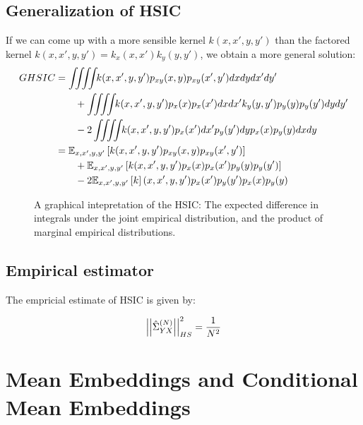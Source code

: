 \documentclass{article} %
\begin{document}
\subsection{Generalization of HSIC}

If we can come up with a more sensible kernel $k(x,x',y,y')$ than the factored kernel $k(x,x',y,y') = k_x(x,x') k_y(y,y')$, we obtain a more general solution:
%
\begin{align}
GHSIC & = \int \!\!\! \int \!\!\!\int \!\!\! \int\!\! k(x,x',y,y')p_{xy}(x,y)p_{xy}(x',y')dxdydx'dy' \\
\nonumber & \qquad + \int \!\!\! \int\!\!\! \int \!\!\! \int\!\! k(x,x',y,y') p_{x}(x)p_{x}(x')dxdx' k_y(y,y') p_y(y) p_y(y') dydy' \\
\nonumber & \qquad - 2 \int \!\!\! \int \!\!\!\int \!\!\! \int\!\! k(x,x',y,y') p_x(x') dx' p_y(y')dy p_x(x) p_y(y) dx dy \\
& = \expectargs{x, x', y, y'}{ k(x,x',y,y')p_{xy}(x,y)p_{xy}(x',y')} \\
\nonumber & \qquad + \expectargs{x, x', y, y'}{ k(x,x',y,y') p_{x}(x)p_{x}(x') p_y(y) p_y(y') } \\
\nonumber & \qquad - 2 \expectargs{x, x', y, y'} k(x,x',y,y') p_x(x') p_y(y') p_x(x) p_y(y)
\end{align}

\begin{figure}
\caption{A graphical intepretation of the HSIC:  The expected difference in integrals under the joint empirical distribution, and the product of marginal empirical distributions.}
\label{fig:hsic}
\end{figure}

\subsection{Empirical estimator}

The empricial estimate of HSIC is given by:

\begin{align}
\left|\left|\hat{\Sigma}^{(N)}_{YX}\right|\right|^2_{HS} = \frac{1}{N^2}
\end{align}


\section{Mean Embeddings and Conditional Mean Embeddings}
\end{document}
